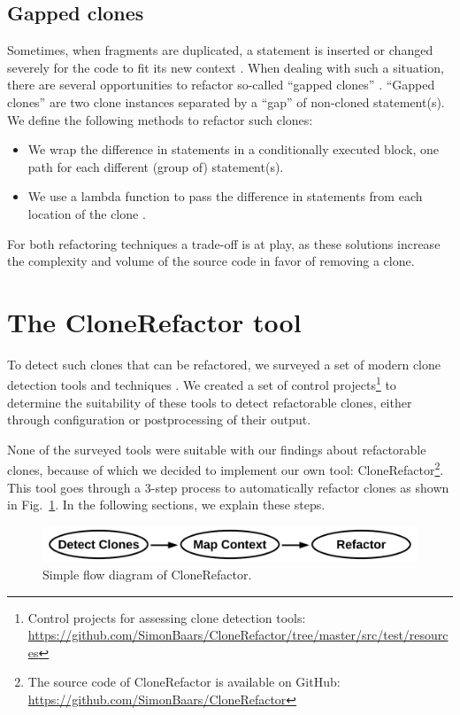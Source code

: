 \documentclass[sigconf,review, table]{acmart}
\begin{document}
\subsection{Gapped clones} \label{sec:t3r}
Sometimes, when fragments are duplicated, a statement is inserted or changed severely for the code to fit its new context \cite{roy2007survey}. When dealing with such a situation, there are several opportunities to refactor so-called ``gapped clones'' \cite{ueda2002detection, zhao2018automatic}. ``Gapped clones'' are two clone instances separated by a ``gap'' of non-cloned statement(s). We define the following methods to refactor such clones:
\begin{itemize}
  \item We wrap the difference in statements in a conditionally executed block, one path for each different (group of) statement(s).
  \item We use a lambda function to pass the difference in statements from each location of the clone \cite{tsantalis2017clone}.
\end{itemize}
For both refactoring techniques a trade-off is at play, as these solutions increase the complexity and volume of the source code in favor of removing a clone.

\section{The CloneRefactor tool}
To detect such clones that can be refactored, we surveyed a set of modern clone detection tools and techniques \cite{svajlenko2014evaluating, sheneamer2016survey, gautam2016various, roy2009comparison}. We created a set of control projects\footnote{Control projects for assessing clone detection tools: \url{https://github.com/SimonBaars/CloneRefactor/tree/master/src/test/resources}} to determine the suitability of these tools to detect refactorable clones, either through configuration or postprocessing of their output.

None of the surveyed tools \cite{ragkhitwetsagul2019siamese, roy2008nicad, semura2017ccfindersw, sajnani2016sourcerercc, saini2018oreo, jiang2007deckard, kamalpriya2017enhancing, mazinanian2016jdeodorant} were suitable with our findings about refactorable clones, because of which we decided to implement our own tool: CloneRefactor\footnote{The source code of CloneRefactor is available on GitHub: \url{https://github.com/SimonBaars/CloneRefactor}}. This tool goes through a 3-step process to automatically refactor clones as shown in Fig.~\ref{fig:clonerefactorflow}. In the following sections, we explain these steps.
\begin{figure}[H]
  \includegraphics[width=1\columnwidth]{img/flow}
  \caption{Simple flow diagram of CloneRefactor.}
  \label{fig:clonerefactorflow}
\end{figure}
\end{document}
